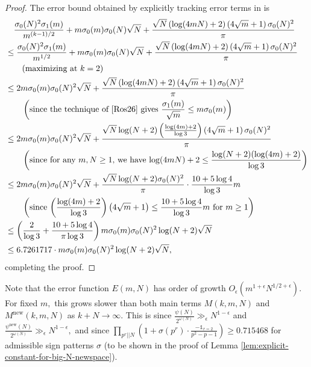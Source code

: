 \documentclass[11pt,letterpaper,reqno]{amsart}
\theoremstyle{definition}
\numberwithin{equation}{section}
\numberwithin{figure}{section}
\numberwithin{table}{section}
\newcommand{\lrp}[1]{\left(#1\right)}
\newcommand{\nw}{\mathrm{new}}
\begin{document}
\begin{proof}
    The error bound obtained by explicitly tracking error terms in \cite[Lemma 2.2]{RVWX26} is
    \begin{align}
    &\quad \frac{\sigma_0(N)^2 \sigma_1(m)}{m^{(k - 1)/2}} + m \sigma_0(m) \sigma_0(N) \sqrt{N} + \frac{\sqrt{N} \lrp{\log(4mN)+2} \lrp{4\sqrt{m}+1} \sigma_0(N)^2}{\pi}\\
    &\leq \frac{\sigma_0(N)^2 \sigma_1(m)}{m^{1/2}} + m \sigma_0(m) \sigma_0(N) \sqrt{N} + \frac{\sqrt{N} \lrp{\log(4mN)+2} \lrp{4\sqrt{m}+1} \sigma_0(N)^2}{\pi}\\
    &\qquad \text{(maximizing at $k = 2$)}\\
    &\leq 2 m \sigma_0(m) \sigma_0(N)^2 \sqrt{N} + \frac{\sqrt{N} \lrp{\log(4mN)+2} \lrp{4\sqrt{m}+1} \sigma_0(N)^2}{\pi}\\
    & \qquad \left(\text{since the technique of \cite[Lemma 2.4]{Ros26} gives $\frac{\sigma_1(m)}{\sqrt{m}} \leq m \sigma_0(m)$}\right)\\
    &\leq 2 m \sigma_0(m) \sigma_0(N)^2 \sqrt{N} + \frac{\sqrt{N} \log(N + 2) \lrp{\frac{\log(4m) + 2}{\log 3}} \lrp{4\sqrt{m}+1} \sigma_0(N)^2}{\pi}\\
    & \qquad \left( \text{since for any $m, N \geq 1$, we have $\log(4mN) + 2 \leq \frac{\log (N + 2) (\log (4m) + 2)}{\log 3}$} \right)\\
    &\leq 2 m \sigma_0(m) \sigma_0(N)^2 \sqrt{N} + \frac{\sqrt{N} \log(N + 2) \sigma_0(N)^2}{\pi} \cdot \frac{10 + 5\log 4}{\log 3}m\\
    & \qquad \left(  \text{since $\lrp{\frac{\log(4m) + 2}{\log 3}} \lrp{4\sqrt{m}+1} \leq \frac{10 + 5\log 4}{\log 3}m$ for $m \geq 1$}\right)\\
    &\leq \lrp{\frac{2}{\log 3} + \frac{10 + 5\log 4}{\pi \log 3} } m\sigma_0(m) \sigma_0(N)^2 \log (N + 2) \sqrt{N} \\
    &\le 6.7261717 \cdot m\sigma_0(m) \sigma_0(N)^2 \log (N + 2) \sqrt{N},
    \end{align}
    completing the proof.
\end{proof}


Note that the error function $E(m, N) $ has order of growth $O_\epsilon \! \lrp{m^{1 + \epsilon} N^{1/2 + \epsilon}}.$ For fixed $m,$ this grows slower than both main terms $M(k, m, N)$ and $M^{\nw}(k, m, N)$ as $k + N \rightarrow \infty.$  This is since $\frac{\psi(N)}{2^{\omega(N)}} \gg_\epsilon  N^{1 - \epsilon}$ and $\frac{\psi^\nw(N)}{2^{\omega(N)}} \gg_\epsilon  N^{1 - \epsilon},$ and since $\prod_{p^r || N} \left( 1 + \sigma(p^r) \cdot \frac{-\mathds{1}_{r = 2}}{p^2 - p - 1}  \right) \ge 0.715468$ for admissible sign patterns $\sigma$ (to be shown in the proof of Lemma \ref{lem:explicit-constant-for-big-N-newspace}).
\end{document}
